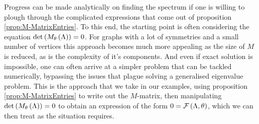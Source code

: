 Progress can be made analytically on finding the spectrum if one is willing to plough through the complicated expressions that come out of proposition \ref{prop:M-MatrixEntries}.
To this end, the starting point is often considering the equation $\det\left( M_{\theta}\left( \Lambda \right) \right)=0$.
For graphs with a lot of symmetries and a small number of vertices this approach becomes much more appealing as the size of $M$ is reduced, as is the complexity of it's components.
And even if exact solution is impossible, one can often arrive at a simpler problem that can be tackled numerically, bypassing the issues that plague solving a generalised eigenvalue problem.
This is the approach that we take in our examples, using proposition \ref{prop:M-MatrixEntries} to write out the $M$-matrix, then manipulating $\det\left( M_{\theta}\left( \Lambda \right) \right)=0$ to obtain an expression of the form $0 = \mathcal{F}\left( \Lambda, \theta \right)$, which we can then treat as the situation requires.

